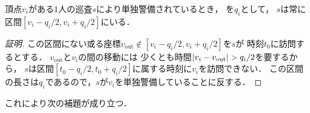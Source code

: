 \begin{lemm}
  \label{lemm:RangeOfPatrollerOnLine}
  頂点$v_i$がある1人の巡査$s$により単独警備されているとき，
  {\maxIdletime}を$q_i$として，
  $s$は常に区間$[v_i - q_i/2, v_i + q_i/2]$にいる．
\end{lemm}
\begin{proof}[証明]
  \newcommand{\vout}{v_{\mathrm{out}}}
  この区間にない或る座標$\vout \notin [v_i - q_i/2, v_i + q_i/2]$を$s$が
  時刻$t_0$に訪問するとする．
  $\vout$と$v_i$の間の移動には
  少くとも時間$\abs{v_i - \vout} > q _i / 2$を要するから，
  $s$は区間$[t_0 - q _i / 2, t_0 + q _i / 2]$に属する時刻に$v_i$を訪問できない．
  この区間の長さは$
    q_i
  $であるので，$s$が$v _i$を単独警備していることに反する．
\end{proof}



これにより次の補題が成り立つ．


